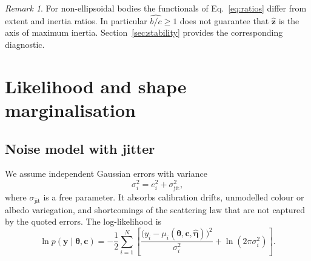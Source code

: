 \documentclass[11pt,a4paper]{article}
\theoremstyle{remark}
\newtheorem{remark}{Remark}
\newcommand{\vect}[1]{\bm{#1}}
\newcommand{\uv}[1]{\hat{\bm{#1}}}
\begin{document}
\begin{remark}
For non-ellipsoidal bodies the functionals of Eq.~\eqref{eq:ratios} differ from extent and inertia
ratios. In particular $\widehat{b/c}\ge1$ does not guarantee that $\uv z$ is the axis of maximum
inertia. Section~\ref{sec:stability} provides the corresponding diagnostic.
\end{remark}

\section{Likelihood and shape marginalisation}
\label{sec:likelihood}

\subsection{Noise model with jitter}
We assume independent Gaussian errors with variance
\begin{equation}
  \sigma_i^2 = e_i^2 + \sigma_{\mathrm{jit}}^2,
  \label{eq:jitter}
\end{equation}
where $\sigma_{\mathrm{jit}}$ is a free parameter. It absorbs calibration drifts, unmodelled colour or
albedo variegation, and shortcomings of the scattering law that are not captured by the quoted errors.
The log-likelihood is
\begin{equation}
  \ln p(\vect y\mid\vect\theta,\vect c)=-\frac12\sum_{i=1}^{N}\left[\frac{\bigl(y_i-\mu_i(\vect\theta,\vect c,\hat{\vect\eta})\bigr)^2}{\sigma_i^2}+\ln(2\pi\sigma_i^2)\right].
  \label{eq:loglike}
\end{equation}
\end{document}
